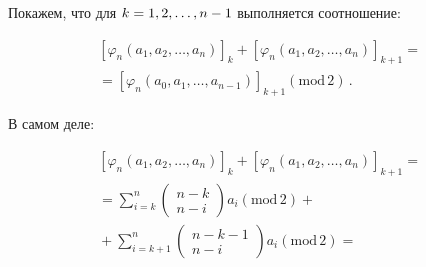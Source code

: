 \begin{multicols}{2}
  Покажем, что для $k\hm= 1,2,\ldots , n-1$ выполняется соотношение:
  
  \noindent
  \begin{multline*}
  \left[ \varphi_n\left( a_1,a_2,\ldots , a_n\right)\right]_k+
  \left[ \varphi_n\left( a_1,a_2,\ldots , a_n\right) \right]_{k+1}={}\\
  {}=\left[ \varphi_n\left( a_0,a_1,\ldots , a_{n-1}\right)\right]_{k+1} 
  (\mathrm{mod}\,2)\,.
  \end{multline*}
  
  В самом деле: 
  
  \noindent
  \begin{multline*}
  \left[ \varphi_n\left( a_1,a_2,\ldots , a_n\right)\right]_k+ 
  \left[ \varphi_n\left( a_1,a_2,\ldots , a_n\right) \right]_{k+1}={}\\
  {}=\sum\limits^n_{i=k} \begin{pmatrix} n-k\\ n-i\end{pmatrix} 
  a_i\left( \mathrm{mod}\,2\right)+{}\\
  {} +\sum\limits^n_{i=k+1} \begin{pmatrix} n-k-1\\ n-i \end{pmatrix} 
  a_i \left(\mathrm{mod}\,2\right)={}
  \end{multline*}
  

\end{multicols}
